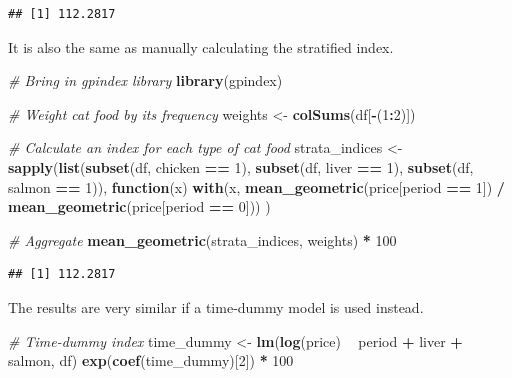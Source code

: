 \documentclass[]{article}
\newenvironment{Shaded}{\begin{snugshade}}{\end{snugshade}}
\newcommand{\CommentTok}[1]{\textcolor[rgb]{0.56,0.35,0.01}{\textit{#1}}}
\newcommand{\ControlFlowTok}[1]{\textcolor[rgb]{0.13,0.29,0.53}{\textbf{#1}}}
\newcommand{\DecValTok}[1]{\textcolor[rgb]{0.00,0.00,0.81}{#1}}
\newcommand{\KeywordTok}[1]{\textcolor[rgb]{0.13,0.29,0.53}{\textbf{#1}}}
\newcommand{\NormalTok}[1]{#1}
\newcommand{\OperatorTok}[1]{\textcolor[rgb]{0.81,0.36,0.00}{\textbf{#1}}}
\newcommand{\StringTok}[1]{\textcolor[rgb]{0.31,0.60,0.02}{#1}}
\begin{document}
\begin{verbatim}
## [1] 112.2817
\end{verbatim}

It is also the same as manually calculating the stratified index.

\begin{Shaded}
\begin{Highlighting}[]
\CommentTok{# Bring in gpindex library}
\KeywordTok{library}\NormalTok{(gpindex)}

\CommentTok{# Weight cat food by its frequency}
\NormalTok{weights <-}\StringTok{ }\KeywordTok{colSums}\NormalTok{(df[}\OperatorTok{-}\NormalTok{(}\DecValTok{1}\OperatorTok{:}\DecValTok{2}\NormalTok{)])}

\CommentTok{# Calculate an index for each type of cat food}
\NormalTok{strata_indices <-}\StringTok{ }
\StringTok{  }\KeywordTok{sapply}\NormalTok{(}\KeywordTok{list}\NormalTok{(}\KeywordTok{subset}\NormalTok{(df, chicken }\OperatorTok{==}\StringTok{ }\DecValTok{1}\NormalTok{), }
              \KeywordTok{subset}\NormalTok{(df, liver }\OperatorTok{==}\StringTok{ }\DecValTok{1}\NormalTok{), }
              \KeywordTok{subset}\NormalTok{(df, salmon }\OperatorTok{==}\StringTok{ }\DecValTok{1}\NormalTok{)),}
         \ControlFlowTok{function}\NormalTok{(x) }\KeywordTok{with}\NormalTok{(x, }\KeywordTok{mean_geometric}\NormalTok{(price[period }\OperatorTok{==}\StringTok{ }\DecValTok{1}\NormalTok{]) }\OperatorTok{/}\StringTok{ }\KeywordTok{mean_geometric}\NormalTok{(price[period }\OperatorTok{==}\StringTok{ }\DecValTok{0}\NormalTok{]))}
\NormalTok{         )}

\CommentTok{# Aggregate}
\KeywordTok{mean_geometric}\NormalTok{(strata_indices, weights) }\OperatorTok{*}\StringTok{ }\DecValTok{100}
\end{Highlighting}
\end{Shaded}

\begin{verbatim}
## [1] 112.2817
\end{verbatim}

The results are very similar if a time-dummy model is used instead.

\begin{Shaded}
\begin{Highlighting}[]
\CommentTok{# Time-dummy index}
\NormalTok{time_dummy <-}\StringTok{ }\KeywordTok{lm}\NormalTok{(}\KeywordTok{log}\NormalTok{(price) }\OperatorTok{~}\StringTok{ }\NormalTok{period }\OperatorTok{+}\StringTok{ }\NormalTok{liver }\OperatorTok{+}\StringTok{ }\NormalTok{salmon, df)}
\KeywordTok{exp}\NormalTok{(}\KeywordTok{coef}\NormalTok{(time_dummy)[}\DecValTok{2}\NormalTok{]) }\OperatorTok{*}\StringTok{ }\DecValTok{100}
\end{Highlighting}
\end{Shaded}
\end{document}
